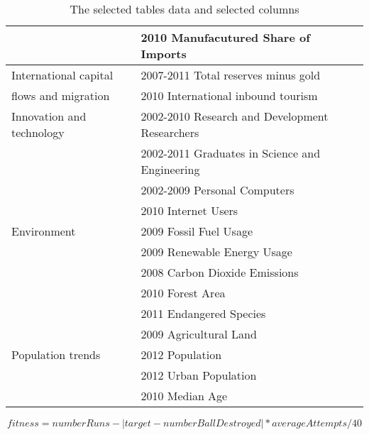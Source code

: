 \documentclass[a4paper,11pt]{article}
\begin{document}
\begin{table}
\begin{tabular}{|l|l|}
		& 2010 Manufacutured Share of Imports \\
		\hline
		International capital & 2007-2011 Total reserves minus gold\\
		flows and migration & 2010 International inbound tourism\\
		\hline
		Innovation and technology & 2002-2010 Research and Development Researchers\\
		& 2002-2011 Graduates in Science and Engineering\\
		& 2002-2009 Personal Computers\\
		& 2010 Internet Users\\
		\hline
		Environment & 2009 Fossil Fuel Usage\\
		& 2009 Renewable Energy Usage\\ 
		& 2008 Carbon Dioxide Emissions\\
		& 2010 Forest Area\\ 
		& 2011 Endangered Species\\
		& 2009 Agricultural Land\\
		\hline
		Population trends & 2012 Population\\
		& 2012 Urban Population\\
		& 2010 Median Age\\
		\hline
	\end{tabular}
	\caption{The selected tables data and selected columns}
	\label{Tab:dataSelect}
\end{table}

\begin{equation}
	fitness = numberRuns-|target-numberBallDestroyed|*averageAttempts/40
	\label{func:fitness}
\end{equation}

{}

\end{document}
